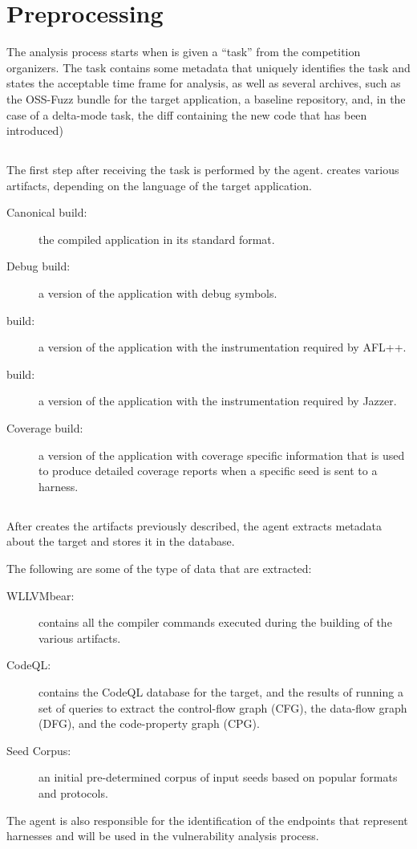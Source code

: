 \section{Preprocessing}
\label{preprocessing}

The analysis process starts when \artiphishell is given a ``task'' from the competition organizers.
The task contains some metadata that uniquely identifies the task and states the acceptable time frame for analysis, as well as several archives, such as the OSS-Fuzz bundle for the target application, a baseline repository, and, in the case of a delta-mode task, the diff containing the new code that has been introduced)

\subsection{\builder}
The first step after receiving the task is performed by the \builder agent.
\builder creates various artifacts, depending on the language of the target application.
\begin{description}
\item[Canonical build:] the compiled application in its standard format.
\item[Debug build:] a version of the application with debug symbols.
\item[\afluzzer build:] a version of the application with the instrumentation required by AFL++.
\item[\jazzmine build:] a version of the application with the instrumentation required by Jazzer.
\item[Coverage build:] a version of the application with coverage specific information that is used to produce detailed coverage reports when a specific seed is sent to a harness.
\end{description}

\subsection{\analyzer}
After \builder creates the artifacts previously described, the \analyzer agent extracts metadata about the target and stores it in the \analysisgraph database.

The following are some of the type of data that are extracted:
\begin{description}
\item[WLLVMbear:] contains all the compiler commands executed during the building of the various artifacts.
\item[CodeQL:] contains the CodeQL database for the target, and the results of running a set of queries to extract the control-flow graph (CFG), the data-flow graph (DFG), and the code-property graph (CPG). 
\item[Seed Corpus:] an initial pre-determined corpus of input seeds based on popular formats and protocols.
\end{description}
The \analyzer agent is also responsible for the identification of the endpoints that represent harnesses and will be used in the vulnerability analysis process.

